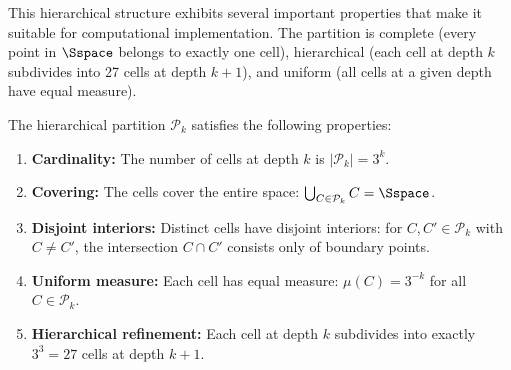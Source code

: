 This hierarchical structure exhibits several important properties that make it suitable for computational implementation. The partition is complete (every point in $\Sspace$ belongs to exactly one cell), hierarchical (each cell at depth $k$ subdivides into 27 cells at depth $k+1$), and uniform (all cells at a given depth have equal measure).

\begin{proposition}
\label{prop:partition_properties}
The hierarchical partition $\mathcal{P}_k$ satisfies the following properties:
\begin{enumerate}[label=(\roman*)]
    \item \textbf{Cardinality:} The number of cells at depth $k$ is $|\mathcal{P}_k| = 3^k$.
    \item \textbf{Covering:} The cells cover the entire space: $\bigcup_{C \in \mathcal{P}_k} C = \Sspace$.
    \item \textbf{Disjoint interiors:} Distinct cells have disjoint interiors: for $C, C' \in \mathcal{P}_k$ with $C \neq C'$, the intersection $C \cap C'$ consists only of boundary points.
    \item \textbf{Uniform measure:} Each cell has equal measure: $\mu(C) = 3^{-k}$ for all $C \in \mathcal{P}_k$.
    \item \textbf{Hierarchical refinement:} Each cell at depth $k$ subdivides into exactly $3^3 = 27$ cells at depth $k+1$.
\end{enumerate}
\end{proposition}

